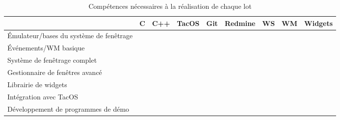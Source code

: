 \begin{table}[h]
\centering
\begin{tabular}{|l|c|c|c|c|c|c|c|c|}
  \rowcolor{dark_grey} \hline &  C & C++ & TacOS & Git & Redmine & WS & WM & Widgets \\
  \hline
  Émulateur/bases du système de fenêtrage & \cellcolor[gray]{0} & \cellcolor[gray]{0.5} & \cellcolor[gray]{0} & \cellcolor[gray]{0.9} & \cellcolor[gray]{0.9} & \cellcolor[gray]{0} & \ \cellcolor[gray]{1} & \cellcolor[gray]{1} \\
  \hline
  Événements/WM basique & \cellcolor[gray]{0.75} & \cellcolor[gray]{0.25} & \cellcolor[gray]{1} & \cellcolor[gray]{0.9} & \cellcolor[gray]{0.9} & \cellcolor[gray]{0.25} & \ \cellcolor[gray]{0.5} & \cellcolor[gray]{1} \\
  \hline
  Système de fenêtrage complet & \cellcolor[gray]{0.5} & \cellcolor[gray]{0.25} & \cellcolor[gray]{1} & \cellcolor[gray]{0.9} & \cellcolor[gray]{0.9} & \cellcolor[gray]{0} & \ \cellcolor[gray]{0.75} & \cellcolor[gray]{1} \\
  \hline
  Gestionnaire de fenêtres avancé & \cellcolor[gray]{1} & \cellcolor[gray]{0} & \cellcolor[gray]{1} & \cellcolor[gray]{0.9} & \cellcolor[gray]{0.9} & \cellcolor[gray]{0.75} & \ \cellcolor[gray]{0} & \cellcolor[gray]{1} \\
  \hline
  Librairie de widgets & \cellcolor[gray]{1} & \cellcolor[gray]{0} & \cellcolor[gray]{1} & \cellcolor[gray]{0.9} & \cellcolor[gray]{0.9} & \cellcolor[gray]{1} & \ \cellcolor[gray]{1} & \cellcolor[gray]{0} \\
  \hline
  Intégration avec TacOS & \cellcolor[gray]{0} & \cellcolor[gray]{1} & \cellcolor[gray]{0} & \cellcolor[gray]{0.9} & \cellcolor[gray]{0.9} & \cellcolor[gray]{1} & \ \cellcolor[gray]{1} & \cellcolor[gray]{1} \\
  \hline
  Développement de programmes de démo & \cellcolor[gray]{1} & \cellcolor[gray]{0.5} & \cellcolor[gray]{1} & \cellcolor[gray]{0.9} & \cellcolor[gray]{0.9} & \cellcolor[gray]{1} & \ \cellcolor[gray]{1} & \cellcolor[gray]{0.25} \\
  \hline
\end{tabular}
\caption{Compétences nécessaires à la réalisation de chaque lot}
\end{table}

